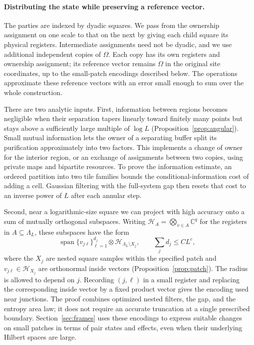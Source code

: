 \paragraph{Distributing the state while preserving a reference vector.}
The parties are indexed by dyadic squares. We pass from the ownership
assignment on one scale to that on the next by giving each child square
its physical registers. Intermediate assignments need not be dyadic, and
we use additional independent copies of $\Omega$. Each copy has its own
registers and ownership assignment; its reference vector remains $\Omega$
in the original site coordinates, up to the small-patch encodings described
below. The operations approximate these reference vectors with an error
small enough to sum over the whole construction.

There are two analytic inputs. First, information between regions becomes
negligible when their separation tapers linearly toward finitely many
points but stays above a sufficiently large multiple of $\log L$
(Proposition~\ref{prop:angular}). Small mutual information lets the owner
of a separating buffer split its purification approximately into two
factors. This implements a change of owner for the interior region, or
an exchange of assignments between two copies, using private maps and
bipartite resources. To prove the information estimate, an ordered
partition into two tile families bounds the conditional-information cost
of adding a cell. Gaussian filtering with the full-system gap then resets
that cost to an inverse power of $L$ after each annular step.

Second, near a logarithmic-size square we can project with high accuracy
onto a sum of mutually orthogonal subspaces. Writing
$\mathcal H_A=\bigotimes_{v\in A}\mathbb C^q$ for the registers in
$A\subseteq\Lambda_L$, these subspaces have the form
\[
 \operatorname{span}\{v_{j\ell}\}_{\ell=1}^{d_j}
       \otimes\mathcal H_{\Lambda_L\setminus X_j},
 \qquad \sum_jd_j\le CL^c,
\]
where the $X_j$ are nested square samples within the specified patch and
$v_{j\ell}\in\mathcal H_{X_j}$ are orthonormal inside vectors
(Proposition~\ref{prop:patch}). The radius is allowed to depend on $j$.
Recording $(j,\ell)$ in a small register and replacing the corresponding
inside vector by a fixed product vector gives the encoding used near
junctions. The proof combines optimized nested filters, the gap, and the
entropy area law; it does not require an accurate truncation at a single
prescribed boundary. Section~\ref{sec:frames} uses these encodings to
express suitable changes on small patches in terms of pair states and
effects, even when their underlying Hilbert spaces are large.

